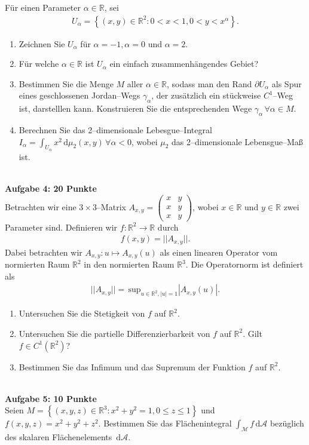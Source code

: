 \documentclass[a4paper,12pt]{article}
\newcommand{\td}{\,\text{d}}
\numberwithin{equation}{section}
\begin{document}
Für einen Parameter $\alpha  \in \mathbb{R}$, sei
\begin{align} 
        U_\alpha =\left\{\left(x,y\right) \in \mathbb{R}^2:0<x<1,0<y<x^\alpha \right\}
.\end{align} 
\begin{enumerate}[label=(\alph*)]
        \item Zeichnen Sie $U_\alpha $ für $\alpha =-1,\alpha =0$ und $\alpha =2$.
        \item Für welche $\alpha  \in \mathbb{R}$ ist $U_\alpha $ ein einfach zusammenhängendes Gebiet?
        \item Bestimmen Sie die Menge $M$ aller $\alpha  \in \mathbb{R}$, sodass man den Rand $\partial U_\alpha $ als Spur eines geschlossenen Jordan--Wegs $\gamma _\alpha $, der zusätzlich ein stückweise $C^1$--Weg ist, darstelllen kann. Konstruieren Sie die entsprechenden Wege $\gamma _\alpha \,\forall \alpha  \in M$.
        \item Berechnen Sie das 2--dimensionale Lebesgue--Integral $I_\alpha =\int_{U_\alpha }^{}x^2\td \mu _2\left(x,y\right)\,\forall \alpha <0$, wobei $\mu _2$ das 2--dimensionale Lebensgue--Maß ist.
\end{enumerate}
\hfill\\\textbf{Aufgabe 4: 20 Punkte}\\ 
Betrachten wir eine $3\times 3$--Matrix $A_{x,y}=\begin{pmatrix}
        x&y\\x&y\\x&y
\end{pmatrix}$, wobei $x \in \mathbb{R}$ und $y \in \mathbb{R}$ zwei Parameter sind. Definieren wir $f:\mathbb{R}^2\rightarrow \mathbb{R}$ durch
\begin{align} 
        f\left(x,y\right)=||A_{x,y}||
.\end{align} 
Dabei betrachten wir $A_{x,y}:u\mapsto A_{x,y}\left(u\right)$ als einen linearen Operator vom normierten Raum $\mathbb{R}^2$ in den normierten Raum $\mathbb{R}^3$. Die Operatornorm ist definiert als
\begin{align} 
        ||A_{x,y}||=\,\text{sup}_{u \in \mathbb{R}^2,|u|=1}|A_{x,y}\left(u\right)|
.\end{align} 
\begin{enumerate}[label=(\alph*)]
        \item Untersuchen Sie die Stetigkeit von $f$ auf $\mathbb{R}^2$.
        \item Untersuchen Sie die partielle Differenzierbarkeit von $f$ auf $\mathbb{R}^2$. Gilt $f \in C^1\left(\mathbb{R}^2\right)$?
        \item Bestimmen Sie das Infimum und das Supremum der Funktion $f$ auf $\mathbb{R}^2$.
\end{enumerate}
\hfill\\\textbf{Aufgabe 5: 10 Punkte}\\ 
Seien $M=\left\{\left(x,y,z\right) \in \mathbb{R}^3:x^2+y^2=1,0\leq z\leq 1\right\}$ und $f\left(x,y,z\right)=x^2+y^2+z^2$. Bestimmen Sie das Flächenintegral $\int_{\mathcal{M}}^{}f\td \mathcal{A}$ bezüglich des skalaren Flächenelements $\td \mathcal{A}$.

\end{document}
